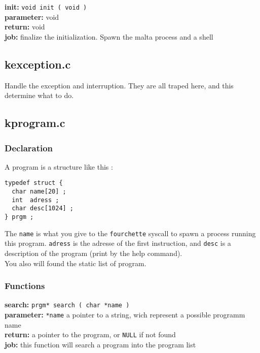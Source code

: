 \noindent\textbf{init:} \verb+void init ( void )+\\
\textbf{parameter:} void\\
\textbf{return:} void\\
\textbf{job:} finalize the initialization. Spawn the malta process and a shell\\

\subsection{kexception.c}

Handle the exception and interruption. They are all traped here, and this determine what to do.

\subsection{kprogram.c}

\subsubsection{Declaration}

A program is a structure like this :
\begin{verbatim}
typedef struct {
  char name[20] ;
  int  adress ;
  char desc[1024] ;
} prgm ;
\end{verbatim}

The \verb+name+ is what you give to the \verb+fourchette+ syscall to spawn a process running this program. \verb+adress+ is the adresse of the first instruction, and \verb+desc+ is a description of the program (print by the help command).\\

You also will found the static list of program.

\subsubsection{Functions}

\noindent\textbf{search:} \verb+prgm* search ( char *name )+\\
\textbf{parameter:} \verb+*name+ a pointer to a string, wich represent a possible programm name\\
\textbf{return:} a pointer to the program, or \verb+NULL+ if not found\\
\textbf{job:} this function will search a program into the program list\\

